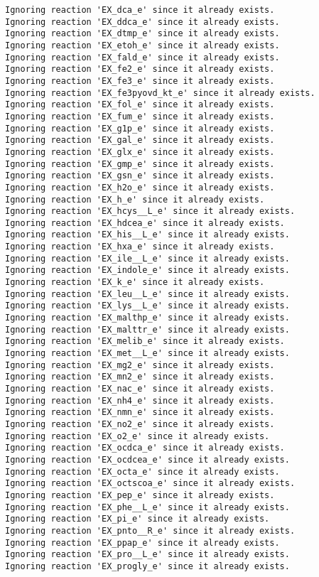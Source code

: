 \documentclass[
  letterpaper,
  DIV=11,
  numbers=noendperiod]{scrartcl}
\begin{document}
\begin{verbatim}
Ignoring reaction 'EX_dca_e' since it already exists.
Ignoring reaction 'EX_ddca_e' since it already exists.
Ignoring reaction 'EX_dtmp_e' since it already exists.
Ignoring reaction 'EX_etoh_e' since it already exists.
Ignoring reaction 'EX_fald_e' since it already exists.
Ignoring reaction 'EX_fe2_e' since it already exists.
Ignoring reaction 'EX_fe3_e' since it already exists.
Ignoring reaction 'EX_fe3pyovd_kt_e' since it already exists.
Ignoring reaction 'EX_fol_e' since it already exists.
Ignoring reaction 'EX_fum_e' since it already exists.
Ignoring reaction 'EX_g1p_e' since it already exists.
Ignoring reaction 'EX_gal_e' since it already exists.
Ignoring reaction 'EX_glx_e' since it already exists.
Ignoring reaction 'EX_gmp_e' since it already exists.
Ignoring reaction 'EX_gsn_e' since it already exists.
Ignoring reaction 'EX_h2o_e' since it already exists.
Ignoring reaction 'EX_h_e' since it already exists.
Ignoring reaction 'EX_hcys__L_e' since it already exists.
Ignoring reaction 'EX_hdcea_e' since it already exists.
Ignoring reaction 'EX_his__L_e' since it already exists.
Ignoring reaction 'EX_hxa_e' since it already exists.
Ignoring reaction 'EX_ile__L_e' since it already exists.
Ignoring reaction 'EX_indole_e' since it already exists.
Ignoring reaction 'EX_k_e' since it already exists.
Ignoring reaction 'EX_leu__L_e' since it already exists.
Ignoring reaction 'EX_lys__L_e' since it already exists.
Ignoring reaction 'EX_malthp_e' since it already exists.
Ignoring reaction 'EX_malttr_e' since it already exists.
Ignoring reaction 'EX_melib_e' since it already exists.
Ignoring reaction 'EX_met__L_e' since it already exists.
Ignoring reaction 'EX_mg2_e' since it already exists.
Ignoring reaction 'EX_mn2_e' since it already exists.
Ignoring reaction 'EX_nac_e' since it already exists.
Ignoring reaction 'EX_nh4_e' since it already exists.
Ignoring reaction 'EX_nmn_e' since it already exists.
Ignoring reaction 'EX_no2_e' since it already exists.
Ignoring reaction 'EX_o2_e' since it already exists.
Ignoring reaction 'EX_ocdca_e' since it already exists.
Ignoring reaction 'EX_ocdcea_e' since it already exists.
Ignoring reaction 'EX_octa_e' since it already exists.
Ignoring reaction 'EX_octscoa_e' since it already exists.
Ignoring reaction 'EX_pep_e' since it already exists.
Ignoring reaction 'EX_phe__L_e' since it already exists.
Ignoring reaction 'EX_pi_e' since it already exists.
Ignoring reaction 'EX_pnto__R_e' since it already exists.
Ignoring reaction 'EX_ppap_e' since it already exists.
Ignoring reaction 'EX_pro__L_e' since it already exists.
Ignoring reaction 'EX_progly_e' since it already exists.

\end{verbatim}
\end{document}
